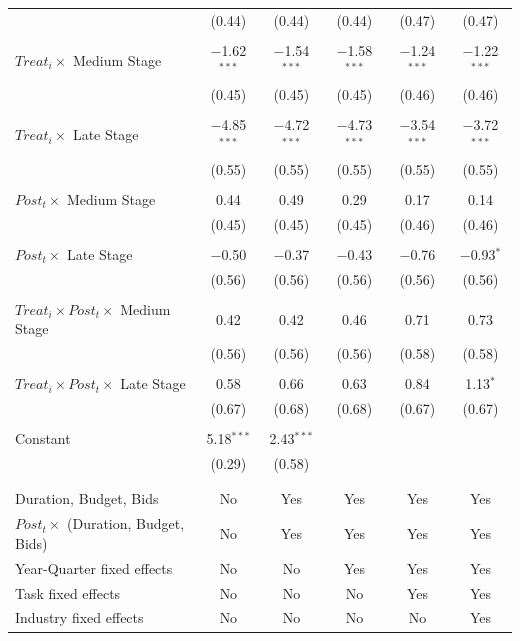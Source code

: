 \documentclass[
]{article}
\begin{document}
\begin{table}[H]
\begin{tabular}{@{\extracolsep{-2pt}}lccccc}
  & (0.44) & (0.44) & (0.44) & (0.47) & (0.47) \\ 
  & & & & & \\ 
 $Treat_i \times$ Medium Stage & $-$1.62$^{***}$ & $-$1.54$^{***}$ & $-$1.58$^{***}$ & $-$1.24$^{***}$ & $-$1.22$^{***}$ \\ 
  & (0.45) & (0.45) & (0.45) & (0.46) & (0.46) \\ 
  & & & & & \\ 
 $Treat_i \times$ Late Stage & $-$4.85$^{***}$ & $-$4.72$^{***}$ & $-$4.73$^{***}$ & $-$3.54$^{***}$ & $-$3.72$^{***}$ \\ 
  & (0.55) & (0.55) & (0.55) & (0.55) & (0.55) \\ 
  & & & & & \\ 
 $Post_t \times$ Medium Stage & 0.44 & 0.49 & 0.29 & 0.17 & 0.14 \\ 
  & (0.45) & (0.45) & (0.45) & (0.46) & (0.46) \\ 
  & & & & & \\ 
 $Post_t \times$ Late Stage & $-$0.50 & $-$0.37 & $-$0.43 & $-$0.76 & $-$0.93$^{*}$ \\ 
  & (0.56) & (0.56) & (0.56) & (0.56) & (0.56) \\ 
  & & & & & \\ 
 $Treat_i \times Post_t \times$ Medium Stage & 0.42 & 0.42 & 0.46 & 0.71 & 0.73 \\ 
  & (0.56) & (0.56) & (0.56) & (0.58) & (0.58) \\ 
  & & & & & \\ 
 $Treat_i \times Post_t \times$ Late Stage & 0.58 & 0.66 & 0.63 & 0.84 & 1.13$^{*}$ \\ 
  & (0.67) & (0.68) & (0.68) & (0.67) & (0.67) \\ 
  & & & & & \\ 
 Constant & 5.18$^{***}$ & 2.43$^{***}$ &  &  &  \\ 
  & (0.29) & (0.58) &  &  &  \\ 
  & & & & & \\ 
\hline \\[-1.8ex] 
Duration, Budget, Bids & No & Yes & Yes & Yes & Yes \\ 
$Post_t \times $  (Duration, Budget, Bids) & No & Yes & Yes & Yes & Yes \\ 
Year-Quarter fixed effects & No & No & Yes & Yes & Yes \\ 
Task fixed effects & No & No & No & Yes & Yes \\ 
Industry fixed effects & No & No & No & No & Yes \\ 

\end{tabular}
\end{table}
\end{document}
